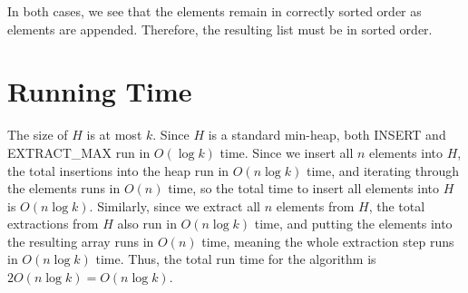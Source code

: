 \documentclass[12pt]{article}
\begin{document}
In both cases, we see that the elements remain in correctly sorted order as elements are appended. Therefore, the resulting list must be in sorted order.

\section*{Running Time}
The size of $H$ is at most $k$. Since $H$ is a standard min-heap, both INSERT and EXTRACT\_MAX run in $O(\log k)$ time. Since we insert all $n$ elements into $H$, the total insertions into the heap run in $O(n\log k)$ time, and iterating through the elements runs in $O(n)$ time, so the total time to insert all elements into $H$ is $O(n\log k)$. Similarly, since we extract all $n$ elements from $H$, the total extractions from $H$ also run in $O(n\log k)$ time, and putting the elements into the resulting array runs in $O(n)$ time, meaning the whole extraction step runs in $O(n\log k)$ time. Thus, the total run time for the algorithm is $2O(n\log k) = O(n \log k)$.
\end{document}
